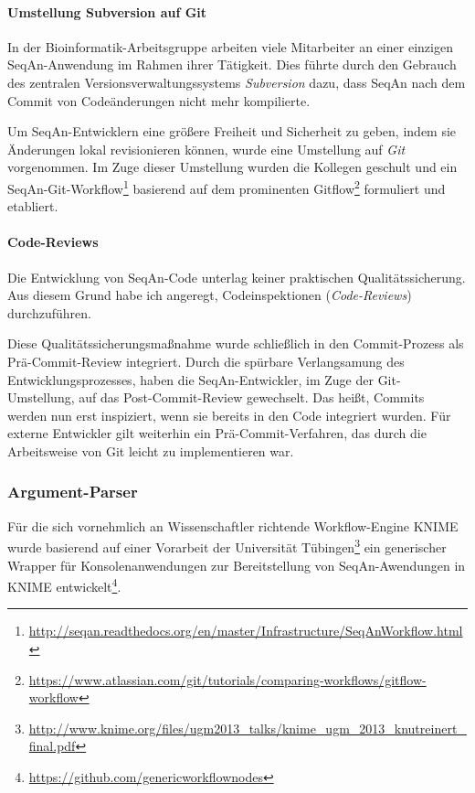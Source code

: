 \paragraph{Umstellung Subversion auf Git}

In der Bioinformatik-Arbeitsgruppe arbeiten viele Mitarbeiter an einer einzigen SeqAn-Anwendung im Rahmen ihrer Tätigkeit. Dies führte durch den Gebrauch des zentralen Versionsverwaltungssystems \textit{Subversion} dazu, dass SeqAn nach dem Commit von Codeänderungen nicht mehr kompilierte.

Um SeqAn-Entwicklern eine größere Freiheit und Sicherheit zu geben, indem sie Änderungen lokal revisionieren können, wurde eine Umstellung auf \textit{Git} vorgenommen. Im Zuge dieser Umstellung wurden die Kollegen geschult und ein SeqAn-Git-Workflow\footnote{\url{http://seqan.readthedocs.org/en/master/Infrastructure/SeqAnWorkflow.html}} basierend auf dem prominenten Gitflow\footnote{\url{https://www.atlassian.com/git/tutorials/comparing-workflows/gitflow-workflow}} formuliert und etabliert.



\paragraph{Code-Reviews}

Die Entwicklung von SeqAn-Code unterlag keiner praktischen Qualitätssicherung. Aus diesem Grund habe ich angeregt, Codeinspektionen (\textit{Code-Reviews}) durchzuführen.

Diese Qualitätssicherungsmaßnahme wurde schließlich in den Commit-Prozess als Prä-Commit-Review integriert. Durch die spürbare Verlangsamung des Entwicklungsprozesses, haben die SeqAn-Entwickler, im Zuge der Git-Umstellung, auf das Post-Commit-Review gewechselt. Das heißt, Commits werden nun erst inspiziert, wenn sie bereits in den Code integriert wurden. Für externe Entwickler gilt weiterhin ein Prä-Commit-Verfahren, das durch die Arbeitsweise von Git leicht zu implementieren war.




\subsubsection{Argument-Parser}
\label{sec:argument-parser}
Für die sich vornehmlich an Wissenschaftler richtende Workflow-Engine KNIME wurde basierend auf einer Vorarbeit der Universität Tübingen\footnote{\url{http://www.knime.org/files/ugm2013_talks/knime_ugm_2013_knutreinert_final.pdf}} ein generischer Wrapper für Konsolenanwendungen zur Bereitstellung von SeqAn-Awendungen in KNIME entwickelt\footnote{\url{https://github.com/genericworkflownodes}}.


